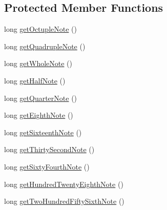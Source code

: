 \subsection*{Protected Member Functions}
\begin{DoxyCompactItemize}
\item 
long \hyperlink{classcom_1_1lclion_1_1midiparser_1_1_note_value_a890f6abc3a9b2a24c4c0e2ce7d5ac790}{get\+Octuple\+Note} ()
\item 
long \hyperlink{classcom_1_1lclion_1_1midiparser_1_1_note_value_ad23ebd281c4fdf32ea9e528483cea923}{get\+Quadruple\+Note} ()
\item 
long \hyperlink{classcom_1_1lclion_1_1midiparser_1_1_note_value_a88753f5e9c5325cd14524672da0d81aa}{get\+Whole\+Note} ()
\item 
long \hyperlink{classcom_1_1lclion_1_1midiparser_1_1_note_value_af8a4a16e82f3799ace366de1756b6b4a}{get\+Half\+Note} ()
\item 
long \hyperlink{classcom_1_1lclion_1_1midiparser_1_1_note_value_a708af9e95f314d27580155ea8959fe45}{get\+Quarter\+Note} ()
\item 
long \hyperlink{classcom_1_1lclion_1_1midiparser_1_1_note_value_a66acedb007f8ce82a482502be7e2e506}{get\+Eighth\+Note} ()
\item 
long \hyperlink{classcom_1_1lclion_1_1midiparser_1_1_note_value_a280a5f4f04adf62c76efae5724afbd44}{get\+Sixteenth\+Note} ()
\item 
long \hyperlink{classcom_1_1lclion_1_1midiparser_1_1_note_value_aff4d51de807b98c18b7f44a00b0d531f}{get\+Thirty\+Second\+Note} ()
\item 
long \hyperlink{classcom_1_1lclion_1_1midiparser_1_1_note_value_a312d45f20b90755da158640695dab4fb}{get\+Sixty\+Fourth\+Note} ()
\item 
long \hyperlink{classcom_1_1lclion_1_1midiparser_1_1_note_value_ae3e0e3b611ea661f08502b3b6d645f76}{get\+Hundred\+Twenty\+Eighth\+Note} ()
\item 
long \hyperlink{classcom_1_1lclion_1_1midiparser_1_1_note_value_a3cac3598f0e435e9df344abc33005074}{get\+Two\+Hundred\+Fifty\+Sixth\+Note} ()
\end{DoxyCompactItemize}
